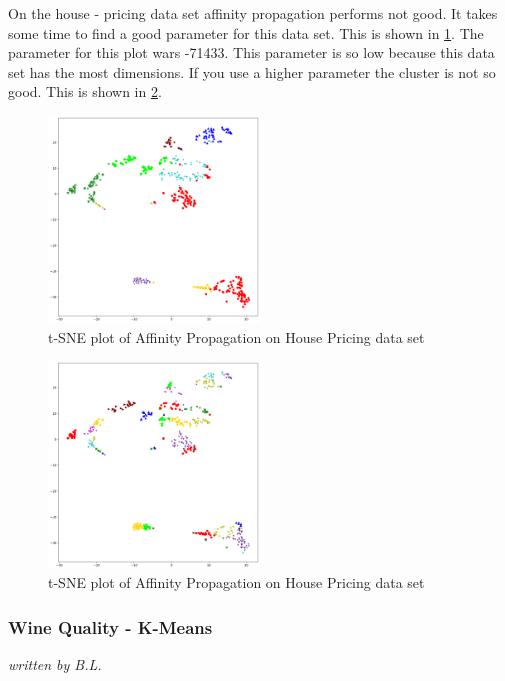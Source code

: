 On the house - pricing data set affinity propagation performs not good. It takes some time to find a good parameter for this data set. This is shown in  \ref{fig:af_house1}. The parameter for this plot wars -71433. This parameter is so low because this data set has the most dimensions. If you use a higher parameter the cluster is not so good. This is shown in \ref{fig:afhouse2}.   

\begin{figure}[H]
		\begin{center}
			\includegraphics[width=0.5\textwidth]{images/af_housepricing71433.png}
		\end{center}
		\caption{t-SNE plot of Affinity Propagation on House Pricing data set}
		\label{fig:af_house1}
	\end{figure}
	
	\begin{figure}[H]
			\begin{center}
				\includegraphics[width=0.5\textwidth]{images/af_housepricing6900.png}
			\end{center}
			\caption{t-SNE plot of Affinity Propagation on House Pricing data set}
			\label{fig:afhouse2}
		\end{figure}

\subsubsection{Wine Quality - K-Means}
\textit{written by B.L.}\\

